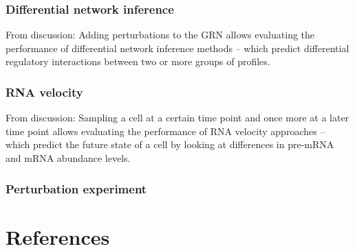 \subsubsection{Differential network inference}
From discussion: Adding perturbations to the GRN allows evaluating the performance of differential network inference methods -- which predict differential regulatory interactions between two or more groups of profiles.
\subsubsection{RNA velocity}
From discussion: Sampling a cell at a certain time point and once more at a later time point allows evaluating the performance of RNA velocity approaches -- which predict the future state of a cell by looking at differences in pre-mRNA and mRNA abundance levels.


\subsubsection{Perturbation experiment}



\clearpage
\section{References}
\printbibliography[heading=none]